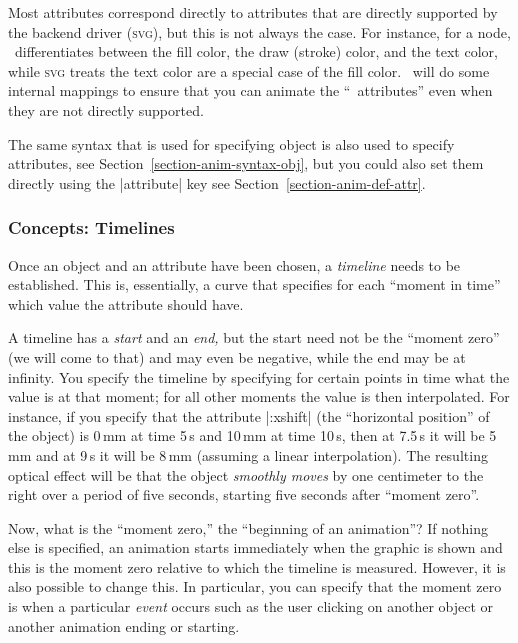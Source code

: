 Most attributes correspond directly to attributes that are directly
supported by the backend driver (\textsc{svg}), but this is not always
the case. For instance, for a node, \tikzname\ differentiates between
the fill color, the draw (stroke) color, and the text color, while
\textsc{svg} treats the text color are a special case of the fill
color. \tikzname\ will do some internal mappings to ensure that you
can animate the ``\tikzname\ attributes'' even when they are not
directly supported.

The same syntax that is used for specifying object is also used to
specify attributes, see Section~\ref{section-anim-syntax-obj}, but you
could also set them directly using the |attribute| key see
Section~\ref{section-anim-def-attr}. 

\subsubsection{Concepts: Timelines}

Once an object and an attribute have been chosen, a \emph{timeline}
needs to be established. This is, essentially, a curve that specifies
for each ``moment in time'' which value the attribute should have.

A timeline has a \emph{start} and an \emph{end,} but the start need
not be the ``moment zero'' (we will come to that) and may even be
negative, while the end may be at infinity. You specify the timeline
by specifying for certain points in time what the value is at that
moment; for all other moments the value is then interpolated. For
instance, if you specify that the attribute |:xshift| (the
``horizontal position'' of the object) is 0\,mm at time 5\,s and 10\,mm
at time 10\,s, then at 7.5\,s it will be 5\,mm and at 9\,s it will
be 8\,mm (assuming a linear interpolation). The resulting optical
effect will be that the object \emph{smoothly moves} by one centimeter
to the right over a period of five seconds, starting five seconds
after ``moment zero''.

Now, what is the ``moment zero,'' the ``beginning of an animation''? If
nothing else is specified, an animation starts immediately when the
graphic is shown and this is the moment zero relative to which the
timeline is measured. However, it is also possible to change this. In
particular, you can specify that the moment zero is when a particular
\emph{event} occurs such as the user clicking on another object or
another animation ending or starting.

